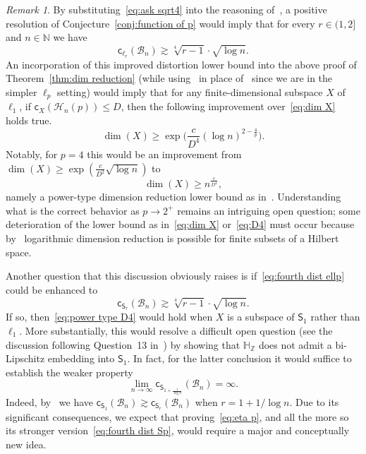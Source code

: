 \documentclass[11pt,reqno]{amsart}
\renewcommand{\H}{\mathbb{H}}
\newcommand{\N}{\mathbb{N}}
\newcommand{\Z}{\mathbb{Z}}
\newcommand{\cc}{{\mathsf{c}}}
\newcommand{\0}{\mathbf{0}}
\renewcommand{\1}{\mathbf 1}
\renewcommand{\ge}{\geqslant}
\renewcommand{\le}{\leqslant}
\theoremstyle{remark}
\newtheorem{remark}[thm]{Remark}
\begin{document}
\begin{remark}\label{rem:sharp in p} By substituting~\eqref{eq:ask sqrt4} into the reasoning of~\cite{LafforgueNaor}, a positive resolution of Conjecture~\ref{conj:function of p} would imply that for every  $r\in (1,2]$ and $n\in \N$ we have
\begin{equation}\label{eq:fourth dist ellp}
\cc_{\ell_r}(\mathcal{B}_n)\gtrsim \sqrt[4]{r-1}\cdot\sqrt{\log n}.
\end{equation}
An incorporation  of this improved distortion lower bound into the above proof of Theorem~\ref{thm:dim reduction} (while using~\cite{LT80} in place of~\cite{NPS18} since we are in the simpler $\ell_p$ setting) would imply that for any finite-dimensional subspace $X$ of $\ell_1$, if $\cc_X(\mathscr{H}_n(p))\le D$, then the following improvement over~\eqref{eq:dim X} holds true.
\begin{equation}\label{eq:D4}
\dim(X)\ge \exp \bigg(\frac{c}{D^4}(\log n)^{2-\frac{4}{p}}\bigg).
\end{equation}
Notably, for $p=4$ this would be an improvement from $\dim(X)\ge \exp \left(\frac{c}{D^2}\sqrt{\log n}\right)$ to
\begin{equation}\label{eq:power type D4}
\dim(X)\ge n^{\frac{c}{D^4}},
\end{equation}
namely a power-type dimension reduction lower bound as in~\cite{BC05}. Understanding what is the correct behavior as $p\to 2^+$ remains an intriguing open question; some deterioration of the lower bound as in~\eqref{eq:dim X} or~\eqref{eq:D4} must occur because by~\cite{JL84} logarithmic dimension reduction is possible for finite subsets of a Hilbert space.

Another question that this discussion obviously raises is if~\eqref{eq:fourth dist ellp} could be enhanced to
\begin{equation}\label{eq:fourth dist Sp}
\cc_{\mathsf{S}_r}(\mathcal{B}_n)\gtrsim \sqrt[4]{r-1}\cdot\sqrt{\log n}.
\end{equation}
If so, then~\eqref{eq:power type D4} would hold when $X$ is a subspace of $\mathsf{S}_1$ rather than $\ell_1$. More substantially, this would resolve a difficult open question (see the discussion following Question~13 in~\cite{NY18}) by showing that $\H_\Z$ does not admit a bi-Lipschitz embedding into $\mathsf{S}_1$. In fact, for the latter conclusion it would suffice to establish the weaker property
\begin{equation}\label{eq:eta p}
\lim_{n\to \infty} \cc_{\mathsf{S}_{1+\frac{1}{\log n}}}(\mathcal{B}_n)=\infty.
\end{equation}
Indeed, by~\cite{NPS18} we have $\cc_{\mathsf{S}_1}(\mathcal{B}_n)\gtrsim \cc_{\mathsf{S}_r}(\mathcal{B}_n)$ when $r=1+1/\log n$.  Due to its  significant consequences, we expect that proving~\eqref{eq:eta p}, and all the more so its stronger version~\eqref{eq:fourth dist Sp}, would  require a major and  conceptually new idea.
\end{remark}
\end{document}

